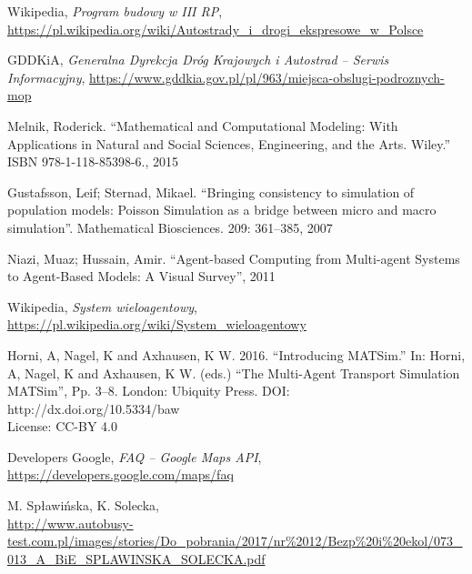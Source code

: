 \begin{thebibliography}{99}

 Wikipedia, \textit{Program budowy w III RP},\\ \url{https://pl.wikipedia.org/wiki/Autostrady\_i\_drogi\_ekspresowe\_w\_Polsce}

 GDDKiA, \textit{Generalna Dyrekcja Dróg Krajowych i Autostrad -- Serwis Informacyjny}, \url{https://www.gddkia.gov.pl/pl/963/miejsca-obslugi-podroznych-mop}

Melnik, Roderick. ``Mathematical and Computational Modeling: With Applications in Natural and Social Sciences, Engineering, and the Arts. Wiley.'' ISBN 978-1-118-85398-6., 2015

Gustafsson, Leif; Sternad, Mikael. ``Bringing consistency to simulation of population models: Poisson Simulation as a bridge between micro and macro simulation''. Mathematical Biosciences. 209: 361–385, 2007

 Niazi, Muaz; Hussain, Amir. ``Agent-based Computing from Multi-agent Systems to Agent-Based Models: A Visual Survey'', 2011

 Wikipedia, \textit{System wieloagentowy},\\ \url{https://pl.wikipedia.org/wiki/System_wieloagentowy}

 Horni, A, Nagel, K and Axhausen, K W. 2016. ``Introducing MATSim.'' In: Horni, A, Nagel, K and
Axhausen, K W. (eds.) ``The Multi-Agent Transport Simulation MATSim'', Pp. 3–8. London: Ubiquity Press. DOI: http://dx.doi.org/10.5334/baw \\ License: CC-BY 4.0

 Developers Google, \textit{FAQ -- Google Maps API},\\ \url{https://developers.google.com/maps/faq}

 M. Spławińska, K. Solecka, \\
\url{http://www.autobusy-test.com.pl/images/stories/Do_pobrania/2017/nr%2012/Bezp%20i%20ekol/073_013_A_BiE_SPLAWINSKA_SOLECKA.pdf} 

\end{thebibliography}




